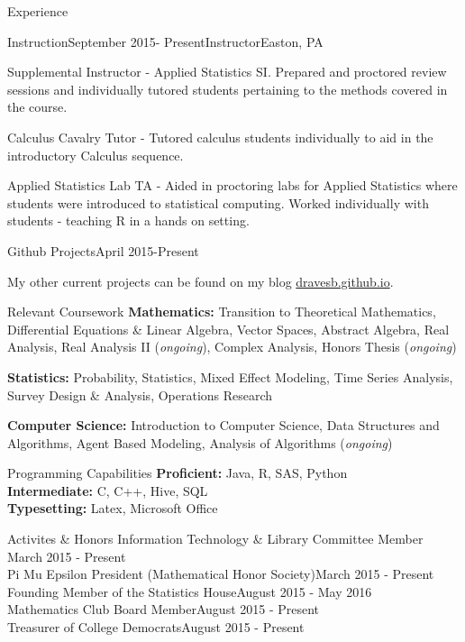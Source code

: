 \documentclass{resume} %
\begin{document}
\begin{rSection}{Experience}
\begin{rSubsection}{Instruction}{September 2015- Present}{Instructor}{Easton, PA} 
\item Supplemental Instructor - Applied Statistics SI. Prepared and proctored review sessions and individually tutored students pertaining to the methods covered in the course.
\item Calculus Cavalry Tutor - Tutored calculus students individually to aid in the introductory Calculus sequence. 
\item Applied Statistics Lab TA - Aided in proctoring labs for Applied Statistics where students were introduced to statistical computing. Worked individually with students - teaching R in a hands on setting. 
\end{rSubsection}


\begin{rSubsection}{Github Projects}{April 2015-Present}{}{}
\item My other current projects can be found on my blog \href{http://dravesb.github.io}{dravesb.github.io}.
\end{rSubsection}

\end{rSection}
\begin{rSection}{Relevant Coursework}
\textbf{Mathematics:} Transition to Theoretical Mathematics, Differential Equations \& Linear Algebra, Vector Spaces, Abstract Algebra, Real Analysis, Real Analysis II (\textit{ongoing}), Complex Analysis, Honors Thesis (\textit{ongoing})

\item \textbf{Statistics:} Probability, Statistics, Mixed Effect Modeling, Time Series Analysis, Survey Design \& Analysis, Operations Research

\item \textbf{Computer Science:} Introduction to Computer Science, Data Structures and Algorithms, Agent Based Modeling, Analysis of Algorithms (\textit{ongoing})

\end{rSection}
\begin{rSection}{Programming Capabilities}
\textbf{Proficient:} Java, R, SAS, Python\\
\textbf{Intermediate:} C, C++, Hive, SQL\\
\textbf{Typesetting:} Latex, Microsoft Office

\end{rSection}

\begin{rSection}{Activites \& Honors}
Information Technology \& Library Committee Member \hfill March 2015 - Present\\
Pi Mu Epsilon President (Mathematical Honor Society)\hfill March 2015 - Present\\
Founding Member of the Statistics House\hfill August 2015 - May 2016 \\
Mathematics Club Board Member\hfill August 2015 - Present \\
Treasurer of College Democrats\hfill August 2015 - Present
\end{rSection}
\end{document}

